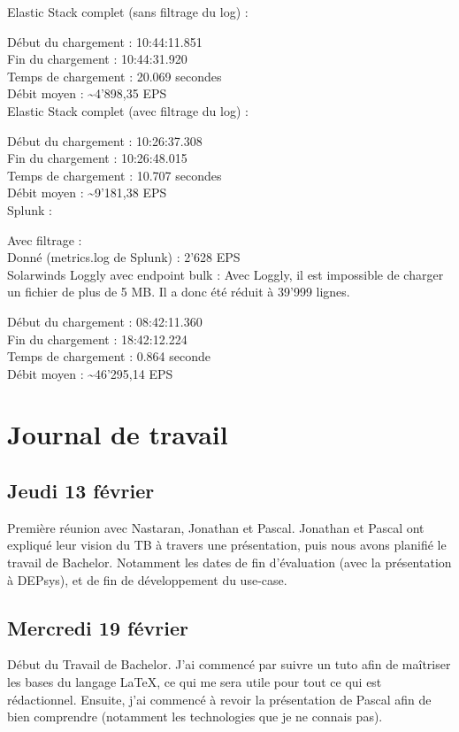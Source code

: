 \documentclass[paper=a4, fontsize=11pt]{scrartcl}
\begin{document}
Elastic Stack complet (sans filtrage du log) :

Début du chargement : 10:44:11.851 \\
Fin du chargement : 10:44:31.920 \\
Temps de chargement : 20.069 secondes \\
Débit moyen : \textasciitilde 4'898,35 EPS \\

Elastic Stack complet (avec filtrage du log) :

Début du chargement : 10:26:37.308 \\
Fin du chargement : 10:26:48.015 \\
Temps de chargement : 10.707 secondes \\
Débit moyen : \textasciitilde 9'181,38 EPS \\

Splunk :

Avec filtrage : \\
Donné (metrics.log de Splunk) : 2'628 EPS \\

Solarwinds Loggly avec endpoint bulk :
Avec Loggly, il est impossible de charger un fichier de plus de 5 MB. Il a donc été réduit à 39'999 lignes.

Début du chargement : 08:42:11.360 \\
Fin du chargement : 18:42:12.224 \\
Temps de chargement : 0.864 seconde \\
Débit moyen : \textasciitilde 46'295,14 EPS \\

\section{Journal de travail}


\subsection{Jeudi 13 février}
    Première réunion avec Nastaran, Jonathan et Pascal. Jonathan et Pascal ont expliqué leur vision du TB à travers une présentation, puis nous avons planifié le travail de Bachelor. Notamment les dates de fin d'évaluation (avec la présentation à DEPsys), et de fin de développement du use-case.
\subsection{Mercredi 19 février}
    Début du Travail de Bachelor. J'ai commencé par suivre un tuto afin de maîtriser les bases du langage \LaTeX, ce qui me sera utile pour tout ce qui est rédactionnel. Ensuite, j'ai commencé à revoir la présentation de Pascal afin de bien comprendre (notamment les technologies que je ne connais pas).
\end{document}
